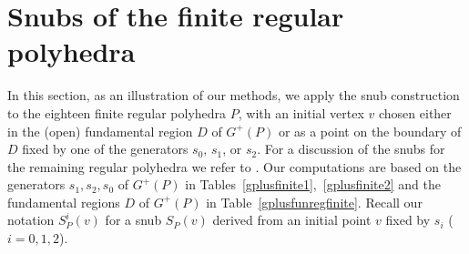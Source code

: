 \documentclass[12pt]{article}
\theoremstyle{definition}\newtheorem{definition}{Definition}[section]
\begin{document}

\section{Snubs of the finite regular polyhedra} 
\label{finite uniform polyhedra}

In this section, as an illustration of our methods, we apply the snub construction to the eighteen finite regular polyhedra $P$,  with an initial vertex $v$ chosen either in the (open) fundamental region $D$ of $G^+(P)$ or as a point on the boundary of $D$ fixed by one of the generators $s_0$, $s_1$, or $s_2$. For a discussion of the snubs for the remaining regular polyhedra we refer to \cite{Sk2}. Our computations are based on the generators $s_1,s_2,s_0$ of $G^{+}(P)$ in Tables~\ref{gplusfinite1},~\ref{gplusfinite2} and the fundamental regions $D$ of $G^{+}(P)$ in Table~\ref{gplusfunregfinite}. Recall our notation ${S}_P^i(v)$ for a snub $S_P(v)$ derived from an initial point $v$ fixed by $s_i$ ($i=0,1,2$). 
\end{document}
